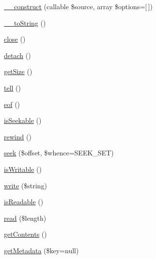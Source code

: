 \begin{DoxyCompactItemize}
\item 
\hyperlink{classGuzzleHttp_1_1Psr7_1_1PumpStream_a68daaafb7bdae1e385482d5bacd15212}{\+\_\+\+\_\+construct} (callable \$source, array \$options=\mbox{[}$\,$\mbox{]})
\item 
\hyperlink{classGuzzleHttp_1_1Psr7_1_1PumpStream_a2dbe76356aa5c4552a31ca4c705c579e}{\+\_\+\+\_\+to\+String} ()
\item 
\hyperlink{classGuzzleHttp_1_1Psr7_1_1PumpStream_a08eeaef85573c150498566ffa9e1f872}{close} ()
\item 
\hyperlink{classGuzzleHttp_1_1Psr7_1_1PumpStream_a6e913458fb2c2b7ca51f600d466dcc19}{detach} ()
\item 
\hyperlink{classGuzzleHttp_1_1Psr7_1_1PumpStream_a592871e85dd572d1ef3f95f6a27948e2}{get\+Size} ()
\item 
\hyperlink{classGuzzleHttp_1_1Psr7_1_1PumpStream_af59623b18ca8aec9aa2bbe09b1a3778e}{tell} ()
\item 
\hyperlink{classGuzzleHttp_1_1Psr7_1_1PumpStream_a1a319d252ffe5ca8ee0afd4248bbc21d}{eof} ()
\item 
\hyperlink{classGuzzleHttp_1_1Psr7_1_1PumpStream_adb38791f41a513a01be857ad59eca8e7}{is\+Seekable} ()
\item 
\hyperlink{classGuzzleHttp_1_1Psr7_1_1PumpStream_adc397c8abc8205c9aaefc12ff3bd1bfa}{rewind} ()
\item 
\hyperlink{classGuzzleHttp_1_1Psr7_1_1PumpStream_a9245d47aa4ba82439759d407115e4c5a}{seek} (\$offset, \$whence=S\+E\+E\+K\+\_\+\+S\+ET)
\item 
\hyperlink{classGuzzleHttp_1_1Psr7_1_1PumpStream_ae14fa2b120954daabe0ed00b3492b180}{is\+Writable} ()
\item 
\hyperlink{classGuzzleHttp_1_1Psr7_1_1PumpStream_a8684ce6b883e9ba97ee9931c580c61fe}{write} (\$string)
\item 
\hyperlink{classGuzzleHttp_1_1Psr7_1_1PumpStream_ad9122608c11bbd21d0b1476b5c8d5fa1}{is\+Readable} ()
\item 
\hyperlink{classGuzzleHttp_1_1Psr7_1_1PumpStream_acf2e568c0d25b1174fa070efb4def9db}{read} (\$length)
\item 
\hyperlink{classGuzzleHttp_1_1Psr7_1_1PumpStream_a15286eba4928175f71e085d042707717}{get\+Contents} ()
\item 
\hyperlink{classGuzzleHttp_1_1Psr7_1_1PumpStream_a2b6f8daa65b2bc0a78f4950dfcb97d48}{get\+Metadata} (\$key=null)
\end{DoxyCompactItemize}


